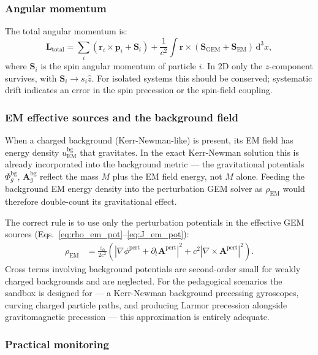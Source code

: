 \documentclass[11pt,a4paper]{article}
\newcommand{\vv}[1]{\mathbf{#1}}
\newcommand{\Phig}{\Phi_g}
\newcommand{\Ag}{\vv{A}_g}
\newcommand{\dd}{\mathrm{d}}
\begin{document}
\subsubsection*{Angular momentum}

The total angular momentum is:
\begin{equation}
  \vv{L}_{\mathrm{total}} = \sum_i\!\left(\vv{r}_i\times\vv{p}_i + \vv{S}_i\right) + \frac{1}{c^2}\int\vv{r}\times(\vv{S}_{\mathrm{GEM}}+\vv{S}_{\mathrm{EM}})\,\dd^3x,
\end{equation}
where $\vv{S}_i$ is the spin angular momentum of particle $i$.  In 2D only the $z$-component survives, with $\vv{S}_i \to s_i\hat{z}$.  For isolated systems this should be conserved; systematic drift indicates an error in the spin precession or the spin-field coupling.

\subsubsection*{EM effective sources and the background field}

When a charged background (Kerr-Newman-like) is present, its EM field has energy density $u_{\mathrm{EM}}^{\mathrm{bg}}$ that gravitates.  In the exact Kerr-Newman solution this is already incorporated into the background metric --- the gravitational potentials $\Phig^{\mathrm{bg}}$, $\Ag^{\mathrm{bg}}$ reflect the mass $M$ plus the EM field energy, not $M$ alone.  Feeding the background EM energy density into the perturbation GEM solver as $\rho_{\mathrm{EM}}$ would therefore double-count its gravitational effect.

The correct rule is to use only the perturbation potentials in the effective GEM sources (Eqs.~\ref{eq:rho_em_pot}--\ref{eq:J_em_pot}):
\begin{align}
  \rho_{\mathrm{EM}} &= \frac{\varepsilon_0}{2c^2}\!\left(|\nabla\phi^{\mathrm{pert}} + \partial_t\vv{A}^{\mathrm{pert}}|^2
    + c^2|\nabla\times\vv{A}^{\mathrm{pert}}|^2\right).
\end{align}
Cross terms involving background potentials are second-order small for weakly charged backgrounds and are neglected.  For the pedagogical scenarios the sandbox is designed for --- a Kerr-Newman background precessing gyroscopes, curving charged particle paths, and producing Larmor precession alongside gravitomagnetic precession --- this approximation is entirely adequate.

\subsubsection*{Practical monitoring}
\end{document}
